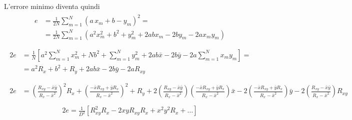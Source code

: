 \documentclass[letterpaper,10pt,italian]{jupyterBook}
\begin{document}
\sphinxAtStartPar
L’errore minimo diventa quindi
\begin{equation*}
\begin{split}\begin{aligned}
  e & = \frac{1}{2N} \sum_{m=1}^{N} \left( a \, x_m  + b -  y_m \right)^2 = \\
    & = \frac{1}{2 N} \sum_{m=1}^N \left( a^2 x_m^2 + b^2 + y_m^2 + 2 a b x_m - 2 b y_m - 2 a x_m y_m  \right) \\
\end{aligned}\end{split}
\end{equation*}\begin{equation*}
\begin{split}\begin{aligned}
2 e & = \frac{1}{N} \left[ a^2 \sum_{m=1}^{N} x_m^2 + N b^2 + \sum_{m=1}^N y_m^2 + 2 a b \bar{x} - 2 b \bar{y} - 2 a \sum_{m=1}^{N} x_m y_m  \right] = \\
  & = a^2 R_x + b^2 + R_y + 2 a b \bar{x} - 2 b \bar{y} - 2 a R_{xy} \\
\end{aligned}\end{split}
\end{equation*}\begin{equation*}
\begin{split}\begin{aligned}
2 e & = \left( \frac{R_{xy} - \bar{x} \bar{y}}{R_x - \bar{x}^2} \right)^2 R_x + \left( \frac{-\bar{x} R_{xy} + \bar{y} R_x}{R_x - \bar{x}^2} \right)^2 + R_y + 2 \left( \frac{R_{xy} - \bar{x} \bar{y}}{R_x - \bar{x}^2} \right) \left( \frac{-\bar{x} R_{xy} + \bar{y} R_x}{R_x - \bar{x}^2} \right) \bar{x} - 2 \left( \frac{-\bar{x} R_{xy} + \bar{y} R_x}{R_x - \bar{x}^2} \right) \bar{y} - 2 \left( \frac{R_{xy} - \bar{x} \bar{y}}{R_x - \bar{x}^2} \right) R_{xy} \\
\end{aligned}\end{split}
\end{equation*}\begin{equation*}
\begin{split}
2 e = \frac{1}{D^2}\left[ R_{xy}^2 R_x - 2 x y R_{xy} R_x + x^2 y^2 R_x + \dots \right]
\end{split}
\end{equation*}
\end{document}

